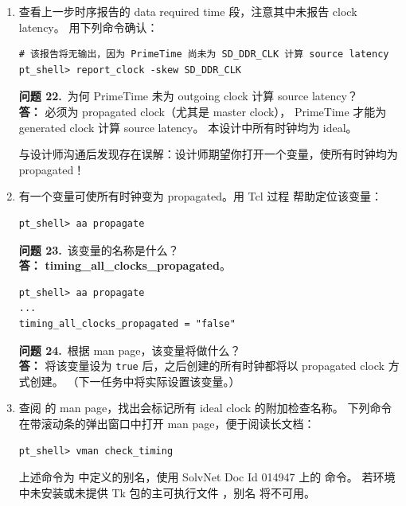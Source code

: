 \begin{enumerate}
  \item 查看上一步时序报告的 data required time 段，注意其中未报告 clock latency。
        用下列命令确认：
\begin{lstlisting}
# 该报告将无输出，因为 PrimeTime 尚未为 SD_DDR_CLK 计算 source latency
pt_shell> report_clock -skew SD_DDR_CLK
\end{lstlisting}

\begin{questionBox}
\textbf{问题 22.}\ 为何 PrimeTime 未为 outgoing clock  计算 source latency？\\[0.35em]
\textbf{答：} 必须为 propagated clock（尤其是 master clock），
PrimeTime 才能为 generated clock 计算 source latency。
本设计中所有时钟均为 ideal。
\end{questionBox}

\begin{noteBox}
与设计师沟通后发现存在误解：设计师期望你打开一个变量，使所有时钟均为 propagated！
\end{noteBox}

  \item 有一个变量可使所有时钟变为 propagated。用 Tcl 过程  帮助定位该变量：
\begin{lstlisting}
pt_shell> aa propagate
\end{lstlisting}

\begin{questionBox}
\textbf{问题 23.}\ 该变量的名称是什么？\\[0.35em]
\textbf{答：} \textbf{timing\_all\_clocks\_propagated}。
\begin{lstlisting}
pt_shell> aa propagate
...
timing_all_clocks_propagated = "false"
\end{lstlisting}

\textbf{问题 24.}\ 根据 man page，该变量将做什么？\\[0.35em]
\textbf{答：} 将该变量设为 \texttt{true} 后，之后创建的所有时钟都将以 propagated clock 方式创建。
（下一任务中将实际设置该变量。）
\end{questionBox}

  \item 查阅  的 man page，找出会标记所有 ideal clock 的附加检查名称。
        下列命令在带滚动条的弹出窗口中打开 man page，便于阅读长文档：
\begin{lstlisting}
pt_shell> vman check_timing
\end{lstlisting}

\begin{noteBox}
上述命令为  中定义的别名，使用 SolvNet Doc Id 014947 上的  命令。
若环境中未安装或未提供 Tk 包的主可执行文件 ，别名  将不可用。
\end{noteBox}


\end{enumerate}
